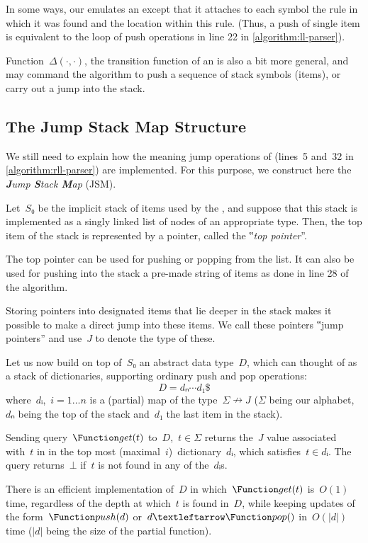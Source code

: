 In some ways, our \RLLp emulates an \LLp except that it attaches to each symbol
the rule in which it was found and the location within this rule.
(Thus, a push of single item is equivalent to the loop of push operations in
line 22 in \cref{algorithm:ll-parser}).

Function~$Δ(·,·)$, the transition function of an \RLLp is also a bit more
general, and may command the algorithm to push a sequence of stack symbols
(items), or carry out a jump into the stack.

\subsection{The Jump Stack Map Structure}
\label{section:jump}
We still need to explain how the meaning jump operations of \RLLp (lines~5
and~32 in \cref{algorithm:rll-parser}) are implemented. For this purpose, we
construct here the \emph{\textbf Jump \textbf Stack \textbf Map} (JSM).

Let~$S₀$ be the implicit stack of items used by the \RLLp, and suppose that
this stack is implemented as a singly linked list of nodes of an appropriate
type. Then, the top item of the stack is represented by a pointer, called the
‟\emph{top pointer}”.

The top pointer can be used for pushing or popping from the list. It can
also be used for pushing into the stack a pre-made string of items as done in
line 28 of the algorithm.

Storing pointers into designated items that lie deeper in the stack makes it
possible to make a direct jump into these items. We call these pointers
‟jump pointers” and use~$J$ to denote the type of these.

Let us now build on top of~$S₀$ an abstract data type~$D$, which can thought of
as a stack of dictionaries,
supporting ordinary push and pop operations:
\[
  D=dₙ⋯d₁\$
\]
where~$dᵢ$,~$i=1…n$ is a (partial) map of the type~$Σ↛J$ ($Σ$ being our
alphabet,~$dₙ$ being the top of the stack and~$d₁$ the last item in the stack).

Sending query~$\Function get(t)$ to~$D$,~$t∈Σ$ returns the~$J$ value
associated with~$t$ in in the top most (maximal~$i$)~dictionary~$dᵢ$, which
satisfies~$t∈dᵢ$. The query returns~$⊥$ if~$t$ is not found in any of
the~$dᵢ$s.

There is an efficient implementation of~$D$ in which~$\Function get(t)$
is~$O(1)$ time, regardless of the depth at which~$t$ is found in~$D$, while
keeping updates of the form~$\Function push(d)$ or~$d←\Function pop()$
  in~$O(|d|)$ time ($|d|$ being the size of the partial function).

